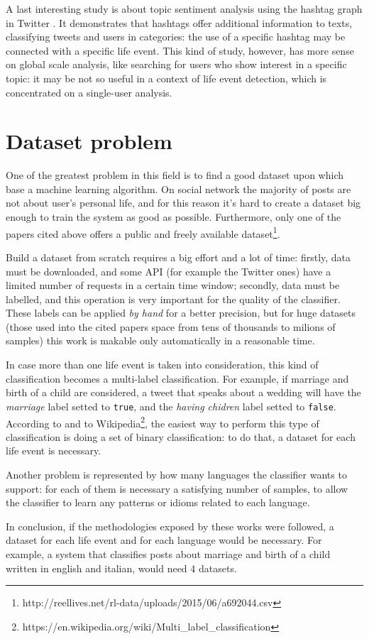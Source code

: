 A last interesting study is about topic sentiment analysis using the hashtag graph in Twitter \cite{wang2011topic}. It demonstrates that hashtags offer additional information to texts, classifying tweets and users in categories: the use of a specific hashtag may be connected with a specific life event. This kind of study, however, has more sense on global scale analysis, like searching for users who show interest in a specific topic: it may be not so useful in a context of life event detection, which is concentrated on a single-user analysis.

\section{Dataset problem}
One of the greatest problem in this field is to find a good dataset upon which base a machine learning algorithm. On social network the majority of posts are not about user's personal life, and for this reason it's hard to create a dataset big enough to train the system as good as possible. Furthermore, only one of the papers cited above \cite{dickinson2015identifying} offers a public and freely available dataset\footnote{http://reellives.net/rl-data/uploads/2015/06/a692044.csv}.

Build a dataset from scratch requires a big effort and a lot of time: firstly, data must be downloaded, and some API (for example the Twitter ones) have a limited number of requests in a certain time window; secondly, data must be labelled, and this operation is very important for the quality of the classifier. These labels can be applied \textit{by hand} for a better precision, but for huge datasets (those used into the cited papers space from tens of thousands to milions of samples) this work is makable only automatically in a reasonable time.

In case more than one life event is taken into consideration, this kind of classification becomes a multi-label classification. For example, if marriage and birth of a child are considered, a tweet that speaks about a wedding will have the \textit{marriage} label setted to \texttt{true}, and the \textit{having chidren} label setted to \texttt{false}. According to \cite{cavalinclassification} and to Wikipedia\footnote{https://en.wikipedia.org/wiki/Multi\_label\_classification}, the easiest way to perform this type of classification is doing a set of binary classification: to do that, a dataset for each life event is necessary.

Another problem is represented by how many languages the classifier wants to support: for each of them is necessary a satisfying number of samples, to allow the classifier to learn any patterns or idioms related to each language.

In conclusion, if the methodologies exposed by these works were followed, a dataset for each life event and for each language would be necessary. For example, a system that classifies posts about marriage and birth of a child written in english and italian, would need 4 datasets. 

